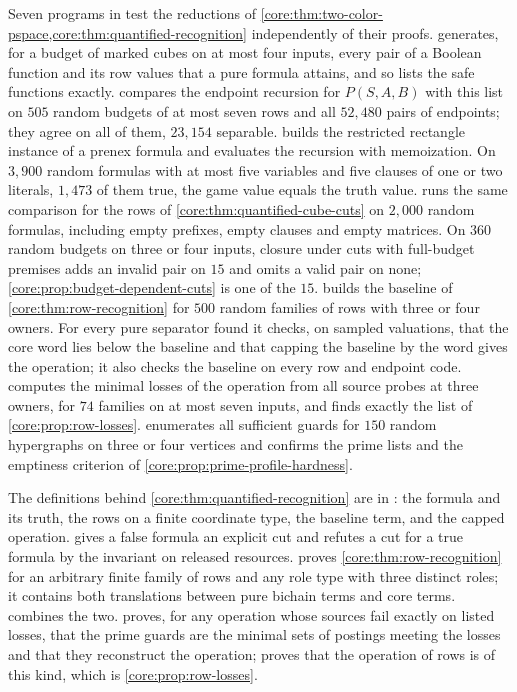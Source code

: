 Seven programs in  test the reductions
of \cref{core:thm:two-color-pspace,core:thm:quantified-recognition}
independently of their proofs.
 generates, for a budget of marked cubes on at most
four inputs, every pair of a Boolean function and its row values that a
pure formula attains, and so lists the safe functions exactly.
 compares the endpoint recursion for $P(S,A,B)$ with
this list on $505$ random budgets of at most seven rows and all
$52{,}480$ pairs of endpoints; they agree on all of them, $23{,}154$
separable.  builds the restricted rectangle
instance of a prenex formula and evaluates the recursion with
memoization. On $3{,}900$ random formulas with at most five variables and
five clauses of one or two literals, $1{,}473$ of them true, the game
value equals the truth value.  runs the same
comparison for the rows of \cref{core:thm:quantified-cube-cuts} on
$2{,}000$ random formulas, including empty prefixes, empty clauses and
empty matrices. On $360$ random budgets on three or four inputs, closure
under cuts with full-budget premises adds an invalid pair on $15$ and
omits a valid pair on none; \cref{core:prop:budget-dependent-cuts} is one
of the $15$.  builds the baseline of
\cref{core:thm:row-recognition} for $500$ random families of rows with
three or four owners. For every pure separator found it checks, on
sampled valuations, that the core word lies below the baseline and that
capping the baseline by the word gives the operation; it also checks the
baseline on every row and endpoint code.  computes
the minimal losses of the operation from all source probes at three
owners, for $74$ families on at most seven inputs, and finds exactly the
list of \cref{core:prop:row-losses}.  enumerates
all sufficient guards for $150$ random hypergraphs on three or four
vertices and confirms the prime lists and the emptiness criterion of
\cref{core:prop:prime-profile-hardness}.

The definitions behind \cref{core:thm:quantified-recognition} are in
: the formula and its
truth, the rows on a finite coordinate type, the baseline term, and the
capped operation.  gives a false
formula an explicit cut and refutes a cut for a true formula by the
invariant on released resources. 
proves \cref{core:thm:row-recognition} for an arbitrary finite family of
rows and any role type with three distinct roles; it contains both
translations between pure bichain terms and core terms.
 combines the two.
 proves, for any operation whose
sources fail exactly on listed losses, that the prime guards are the
minimal sets of postings meeting the losses and that they reconstruct the
operation;  proves that the operation of
rows is of this kind, which is \cref{core:prop:row-losses}.

